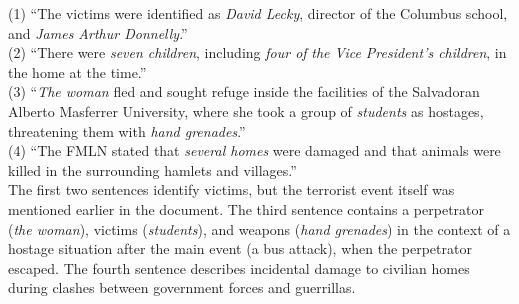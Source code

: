 \noindent
(1) ``The victims were identified as {\em David Lecky}, director of the
Columbus school, and {\em James Arthur Donnelly}.'' \\


\noindent
(2) ``There were {\em seven children}, including {\em four of}
  {\em the Vice President's children}, in the home at the time.'' \\


\noindent
(3) ``{\em The woman} fled and sought refuge inside the facilities of the
Salvadoran Alberto Masferrer University, where she took a group of
{\em students} as hostages, threatening them with
{\em hand grenades}.''  \\


\noindent
(4) ``The FMLN stated that {\em several homes} were damaged and that
animals were killed in the surrounding hamlets and villages.''  \\




The first two sentences identify victims, but the terrorist event
itself was mentioned earlier in the document. The third sentence
contains a perpetrator 
({\it the woman}), victims ({\it students}), and weapons ({\it hand grenades}) in the
context of a hostage situation after the main event (a bus attack),
when the perpetrator escaped.  The fourth sentence describes incidental damage to
civilian homes during clashes between government forces and guerrillas.


